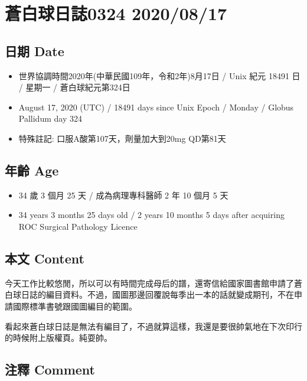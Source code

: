 \documentclass[a5paper, 11pt
]{book}
\providecommand{\tightlist}{%
  \setlength{\itemsep}{0pt}\setlength{\parskip}{0pt}}
\begin{document}
\hypertarget{ux84bcux767dux7403ux65e5ux8a8c0324-20200817}{%
\section{蒼白球日誌0324
2020/08/17}\label{ux84bcux767dux7403ux65e5ux8a8c0324-20200817}}

\hypertarget{ux65e5ux671f-date-67}{%
\subsection{日期 Date}\label{ux65e5ux671f-date-67}}

\begin{itemize}
\tightlist
\item
  世界協調時間2020年(中華民國109年，令和2年)8月17日 / Unix 紀元 18491 日
  / 星期一 / 蒼白球紀元第324日
\item
  August 17, 2020 (UTC) / 18491 days since Unix Epoch / Monday / Globus
  Pallidum day 324
\item
  特殊註記: 口服A酸第107天，劑量加大到20mg QD第81天
\end{itemize}

\hypertarget{ux5e74ux9f61-age-67}{%
\subsection{年齡 Age}\label{ux5e74ux9f61-age-67}}

\begin{itemize}
\tightlist
\item
  34 歲 3 個月 25 天 / 成為病理專科醫師 2 年 10 個月 5 天
\item
  34 years 3 months 25 days old / 2 years 10 months 5 days after
  acquiring ROC Surgical Pathology Licence
\end{itemize}

\hypertarget{ux672cux6587-content-67}{%
\subsection{本文 Content}\label{ux672cux6587-content-67}}

今天工作比較悠閒，所以可以有時間完成母后的譜，還寄信給國家圖書館申請了蒼白球日誌的編目資料。不過，國圖那邊回覆說每季出一本的話就變成期刊，不在申請國際標準書號跟國圖編目的範圍。

看起來蒼白球日誌是無法有編目了，不過就算這樣，我還是要很帥氣地在下次印行的時候附上版權頁。純耍帥。

\hypertarget{ux6ce8ux91cb-comment-67}{%
\subsection{注釋 Comment}\label{ux6ce8ux91cb-comment-67}}
\end{document}
